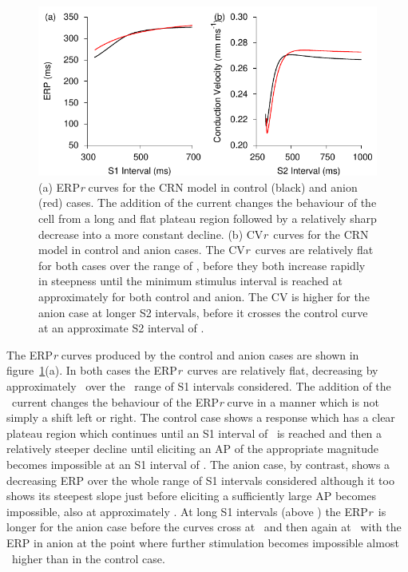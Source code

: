 \begin{figure}
\begin{center}
\includegraphics{figures/toolkit/anion/figures/03_ERPR}
\end{center}
\caption[Anion Current ERPr and CVr] {
\label{fig:toolkit:anion:erpr}
(a)
ERP\emph{r} curves for the CRN model in control (black) and anion
(red) cases.
The addition of the  current changes the behaviour of the cell from a long
and flat plateau region followed by a relatively sharp decrease into a more
constant decline.
(b)
CV\emph{r}\ curves for the CRN model in control and anion cases.
 The CV\emph{r}\ curves are relatively flat for both cases over the range of
, before they both increase rapidly in steepness until the minimum
stimulus interval is reached at approximately  for both control and anion.
The CV is higher for the anion case at longer S2 intervals, before it
crosses the control curve at an approximate S2 interval of .
}
\end{figure}

The ERP\emph{r} curves produced by the control and anion cases are shown in
figure~\ref{fig:toolkit:anion:erpr}(a).
In both cases the ERP\emph{r}\ curves are relatively
flat, decreasing by approximately \ over the \ range of S1
intervals considered.  The addition of the \ current changes the
behaviour of the ERP\emph{r} curve in a manner which is not simply a shift left
or right.  The control case shows a response which has a clear plateau region
which continues until an S1 interval of \ is reached and then a
relatively steeper decline until eliciting an AP of the appropriate magnitude
becomes impossible at an S1 interval of .  The anion case, by contrast,
shows a decreasing ERP over the whole range of S1 intervals considered although
it too shows its steepest slope just before eliciting a sufficiently large AP
becomes impossible, also at approximately .  At long S1 intervals (above
) the ERP\emph{r}\ is longer for the anion case before the curves cross
at \  and then again at \ with the ERP in anion at the point
where further stimulation becomes impossible almost \ higher than in the
control case.

